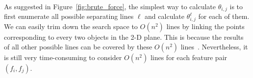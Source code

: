 

 As suggested in Figure~\ref{fig:brute_force}, the simplest way to calculate $\theta_{i,j}$ is to first enumerate all possible separating lines $\ell$ and calculate $\theta_{i,j}^\ell$ for each of them. We can easily trim down the search space to $O(n^2)$ lines by linking the points corresponding to every two objects in the 2-D plane. This is because the results of all other possible lines can be covered by these $O(n^2)$ lines~\cite{vapnik1998statistical}. Nevertheless, it is still very time-consuming to consider $O(n^2)$ lines for each feature pair $(f_i,f_j)$.

